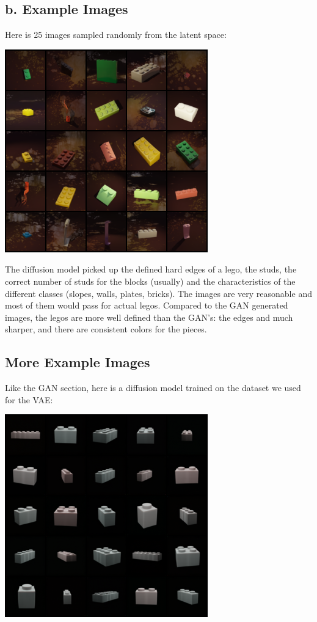 \documentclass[]{article}
\begin{document}
\newpage
\subsection*{b. Example Images}
Here is 25 images sampled randomly from the latent space:
\begin{center}
\includegraphics[scale=1]{./imgs/25_diff}
\end{center}
The diffusion model picked up the defined hard edges of a lego, the studs,
the correct number of studs for the blocks (usually) and the characteristics of the different classes (slopes, walls, plates, bricks).
The images are very reasonable and most of them would pass for actual legos.
Compared to the GAN generated images, the legos are more well defined 
than the GAN's: the edges and much sharper, and there are consistent colors for the pieces. 

\newpage
\subsection*{More Example Images}
Like the GAN section, here is a diffusion model trained on the dataset we used for the VAE: \\
\begin{center}
\includegraphics[scale=1]{./imgs/25_diff_vae}
\end{center}
\end{document}
